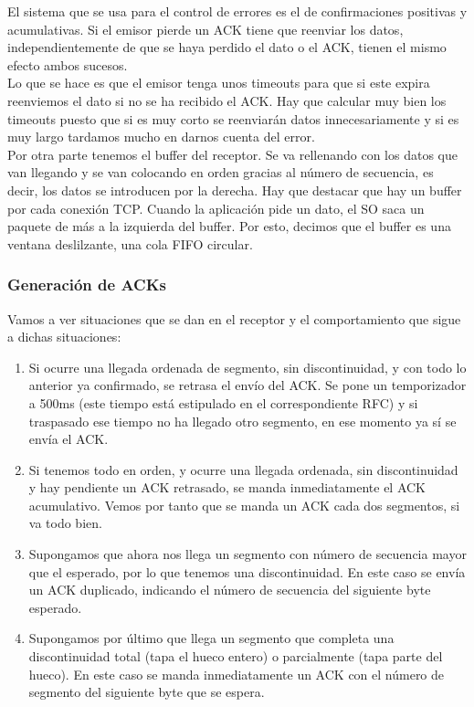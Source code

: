 El sistema que se usa para el control de errores es el de confirmaciones positivas y acumulativas. Si el emisor pierde un ACK tiene que reenviar los datos, independientemente de que se haya perdido el dato o el ACK, tienen el mismo efecto ambos sucesos.\\

Lo que se hace es que el emisor tenga unos timeouts para que si este expira reenviemos el dato si no se ha recibido el ACK. Hay que calcular muy bien los timeouts puesto que si es muy corto se reenviarán datos innecesariamente y si es muy largo tardamos mucho en darnos cuenta del error.\\

Por otra parte tenemos el buffer del receptor. Se va rellenando con los datos que van llegando y se van colocando en orden gracias al número de secuencia, es decir, los datos se introducen por la derecha. Hay que destacar que hay un buffer por cada conexión TCP. Cuando la aplicación pide un dato, el SO saca un paquete de más a la izquierda del buffer. Por esto, decimos que el buffer es una ventana deslilzante, una cola FIFO circular.

\subsubsection{Generación de ACKs}
Vamos a ver situaciones que se dan en el receptor y el comportamiento que sigue a dichas situaciones:   
\begin{enumerate}
    \item Si ocurre una llegada ordenada de segmento, sin discontinuidad, y con todo lo anterior ya confirmado, se retrasa el envío del ACK. Se pone un temporizador a \unit{500}{ms} (este tiempo está estipulado en el correspondiente RFC) y si traspasado ese tiempo no ha llegado otro segmento, en ese momento ya sí se envía el ACK. 
    \item Si tenemos todo en orden, y ocurre una llegada ordenada, sin discontinuidad y hay pendiente un ACK retrasado, se manda inmediatamente el ACK acumulativo. Vemos por tanto que se manda un ACK cada dos segmentos, si va todo bien. 
    \item Supongamos que ahora nos llega un segmento con número de secuencia mayor que el esperado, por lo que tenemos una discontinuidad. En este caso se envía un ACK duplicado, indicando el número de secuencia del siguiente byte esperado.
    \item Supongamos por último que llega un segmento que completa una discontinuidad total (tapa el hueco entero) o parcialmente (tapa parte del hueco). En este caso se manda inmediatamente un ACK con el número de segmento del siguiente byte que se espera.
\end{enumerate}

